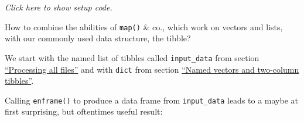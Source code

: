 \documentclass[]{book}
\newenvironment{Shaded}{\begin{snugshade}}{\end{snugshade}}
\newcommand{\ControlFlowTok}[1]{\textcolor[rgb]{0.13,0.29,0.53}{\textbf{#1}}}
\newcommand{\DecValTok}[1]{\textcolor[rgb]{0.00,0.00,0.81}{#1}}
\newcommand{\KeywordTok}[1]{\textcolor[rgb]{0.13,0.29,0.53}{\textbf{#1}}}
\newcommand{\NormalTok}[1]{#1}
\newcommand{\OperatorTok}[1]{\textcolor[rgb]{0.81,0.36,0.00}{\textbf{#1}}}
\newcommand{\StringTok}[1]{\textcolor[rgb]{0.31,0.60,0.02}{#1}}
\begin{document}
\emph{Click here to show setup code.}

\begin{Shaded}
\end{Shaded}

How to combine the abilities of \texttt{map()} \& co., which work on vectors and lists, with our commonly used data structure, the tibble?

We start with the named list of tibbles called \texttt{input\_data} from section \protect\hyperlink{map}{``Processing all files''} and with \texttt{dict} from section \protect\hyperlink{names}{``Named vectors and two-column tibbles''}.

Calling \texttt{enframe()} to produce a data frame from \texttt{input\_data} leads to a maybe at first surprising, but oftentimes useful result:

\begin{Shaded}
\end{Shaded}
\end{document}

